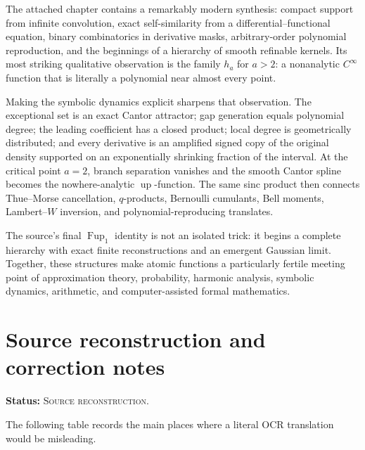 \documentclass[11pt]{article}
\theoremstyle{definition}
\theoremstyle{remark}
\newcommand{\Up}{\operatorname{up}}
\newcommand{\Fup}{\operatorname{Fup}}
\newcommand{\SourceStatus}{\textcolor{SourceBlue}{\textsc{Source reconstruction}}}
\newcommand{\status}[1]{\par\smallskip\noindent\textbf{Status:} #1.\par\smallskip}
\begin{document}
The attached chapter contains a remarkably modern synthesis: compact support from infinite convolution, exact self-similarity from a differential--functional equation, binary combinatorics in derivative masks, arbitrary-order polynomial reproduction, and the beginnings of a hierarchy of smooth refinable kernels.  Its most striking qualitative observation is the family \(h_a\) for \(a>2\): a nonanalytic \(C^\infty\) function that is literally a polynomial near almost every point.

Making the symbolic dynamics explicit sharpens that observation.  The exceptional set is an exact Cantor attractor; gap generation equals polynomial degree; the leading coefficient has a closed product; local degree is geometrically distributed; and every derivative is an amplified signed copy of the original density supported on an exponentially shrinking fraction of the interval.  At the critical point \(a=2\), branch separation vanishes and the smooth Cantor spline becomes the nowhere-analytic \(\Up\)-function.  The same sinc product then connects Thue--Morse cancellation, \(q\)-products, Bernoulli cumulants, Bell moments, Lambert--\(W\) inversion, and polynomial-reproducing translates.

The source's final \(\Fup_1\) identity is not an isolated trick: it begins a complete hierarchy with exact finite reconstructions and an emergent Gaussian limit.  Together, these structures make atomic functions a particularly fertile meeting point of approximation theory, probability, harmonic analysis, symbolic dynamics, arithmetic, and computer-assisted formal mathematics.

\appendix

\section{Source reconstruction and correction notes}
\label{app:repairs}

\status{\SourceStatus}

The following table records the main places where a literal OCR translation would be misleading.
\end{document}
